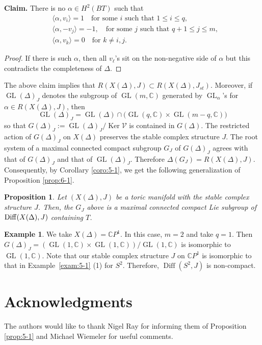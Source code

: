 \documentclass[12pt]{amsart}
\theoremstyle{plain} \numberwithin{equation}{section}
\newtheorem{prop}[theo]{Proposition}
\theoremstyle{definition}
\newtheorem{exam}[theo]{Example}
\def\C{\mathbb C}
\DeclareMathOperator{\GL}{GL}
\DeclareMathOperator{\Diff}{Diff}
\DeclareMathOperator{\Ker}{Ker}
\def\Jst{J_{st}}
\begin{document}
\medskip
\noindent
{\bf Claim.}  There is no $\alpha\in H^2(BT)$ such that 
\[
\begin{split}
&\langle \alpha,v_i\rangle=1\quad \text{for some $i$ such that $1\le i\le q$},\\
&\langle\alpha,-v_j\rangle=-1,\quad \text{for some $j$ such that $q+1\le j\le m$},\\ 
&\langle\alpha,v_k\rangle=0\quad \text{for $k\not=i,j$}.
\end{split}
\]

\begin{proof}
If there is such $\alpha$, then all $v_\ell$'s sit on the non-negative side of $\alpha$ but this contradicts the completeness of $\Delta$. 
\end{proof} 
 
The above claim implies that $R(X(\Delta),J)\subset R(X(\Delta),\Jst)$.  Moreover, if $\GL(\Delta)_J$ denotes the subgroup of $\GL(m,\C)$ generated by $\GL_\alpha$'s for $\alpha \in R(X(\Delta),J)$, then 
\[
\GL(\Delta)_J=\GL(\Delta)\cap\big(\GL(q,\C)\times\GL(m-q,\C)\big)
\]
so that $G(\Delta)_J:=\GL(\Delta)_J/\Ker\mathcal V$ is contained in $G(\Delta)$.  The restricted action of $G(\Delta)_J$ on $X(\Delta)$ preserves  the stable complex structure $J$.  The root system of a maximal connected compact subgroup $G_J$ of $G(\Delta)_J$ agrees with that of $G(\Delta)_J$ and that of $\GL(\Delta)_J$.  Therefore $\Delta(G_J)=R(X(\Delta),J)$. 
Consequently, by Corollary \ref{coro:5-1}, we get the following generalization of Proposition \ref{prop:6-1}.
\begin{prop} \label{prop:6-2}
Let $(X(\Delta),J)$ be a toric manifold with the stable complex structure $J$.  Then, the $G_J$ above is a maximal connected compact Lie subgroup of ${\rm Diff}(X(\Delta),J)$ containing $T$.
\end{prop}

\begin{exam}
We take $X(\Delta)=\C P^1$.  In this case, $m=2$ and take $q=1$.  Then $G(\Delta)_J=(\GL(1,\C)\times \GL(1,\C))/\GL(1,\C)$ is isomorphic to $\GL(1,\C)$.  Note that our stable complex structure $J$ on $\C P^1$ is isomorphic to that in Example~\ref{exam:5-1} (1) for $S^{2}$. Therefore, $\Diff(S^2,J)$ is non-compact.  
\end{exam}

\section*{Acknowledgments}
The authors would like to thank Nigel Ray for informing them of Proposition \ref{prop:5-1} and Michael Wiemeler for useful comments.  
\end{document}
